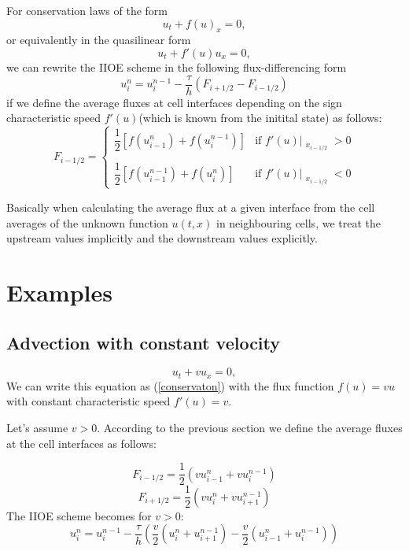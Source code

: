 \documentclass{article}
\begin{document}
	
For conservation laws of the form
\begin{equation}
	u_t + f(u)_x = 0, 
	\label{conservaton}
\end{equation}
or equivalently in the quasilinear form
\begin{equation}
	u_t + f'(u)u_x = 0, 
\end{equation}
we can rewrite the IIOE scheme in the following flux-differencing form
\begin{equation}
	u_i^{n} = u_i^{n - 1} - \dfrac{\tau}{h}(F_{i + 1/2} - F_{i - 1/2})
\end{equation}
if we define the average fluxes at cell interfaces depending on the sign characteristic speed $ f'(u) $(which is known from the initital state) as follows:
\[
F_{i - 1/2} = 
\begin{cases}
	\dfrac{1}{2}\left[f(u^n_{i-1}) + f(u^{n-1}_{i})\right] &  \text{if } f'(u)\big|_{\substack{x_{i-1/2}}} > 0\\
	\\
	\dfrac{1}{2}\left[f(u^{n-1}_{i-1}) + f(u^{n}_{i})\right] &  \text{if } f'(u)\big|_{\substack{x_{i-1/2}}} < 0
\end{cases}
\]


Basically when calculating the average flux at a given interface from the cell averages of the unknown function $ u(t,x) $ in neighbouring cells, we treat the upstream values implicitly and the downstream values explicitly.


\section{Examples}
\subsection{Advection with constant velocity}

\begin{equation}
	u_t + vu_x = 0, 
	\label{adv}
\end{equation}
We can write this equation as (\ref{conservaton}) with the flux function $ f(u) = vu $ with constant characteristic speed $ f'(u) = v $.

Let's assume $ v > 0 $. According to the previous section we define the average fluxes at the cell interfaces as follows:

\[
F_{i - 1/2} = \dfrac{1}{2}(vu^n_{i-1} + vu^{n-1}_{i})
\]
\[
F_{i + 1/2} = \dfrac{1}{2}(vu^n_{i} + vu^{n-1}_{i+1})
\]
The IIOE scheme becomes for $ v>0 $:
\[
u_i^{n} = u_i^{n - 1} - \dfrac{\tau}{h}\left(\dfrac{v}{2}(u^n_{i} + u^{n-1}_{i+1}) - \dfrac{v}{2}(u^n_{i-1} + u^{n-1}_{i})\right)
\]
\end{document}
